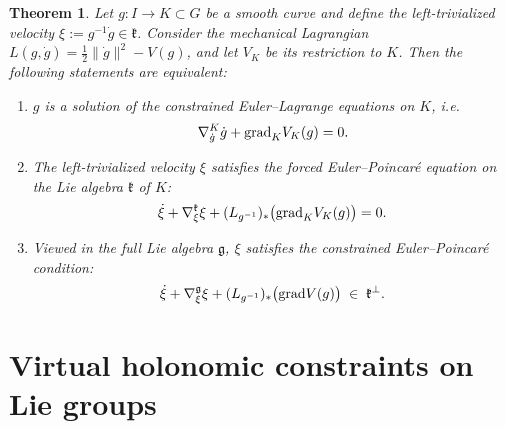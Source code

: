 \documentclass[letterpaper, 10 pt, conference]{ieeeconf}
\newtheorem{theorem}{Theorem}
\newcommand{\grad}{\normalfont{\text{grad}}}
\begin{document}
\begin{theorem}\label{thm:holonomic-EP-left}
Let $g:I\to K\subset G$ be a smooth curve and define the left-trivialized velocity
$\xi := g^{-1}\dot g\in\mathfrak{k}$. Consider the mechanical Lagrangian
$L(g,\dot g)=\tfrac12\|\dot g\|^2 - V(g)$,
and let $V_K$ be its restriction to $K$. Then the following statements are equivalent:
\begin{enumerate}
    \item $g$ is a solution of the constrained Euler--Lagrange equations on $K$, i.e.
    \begin{equation}\label{holonomic:EL}
        \nabla^K_{\dot g}\dot g + \grad_K V_K(g) = 0.
    \end{equation}

    \item The left-trivialized velocity $\xi$ satisfies the forced Euler--Poincar\'e equation
    on the Lie algebra $\mathfrak{k}$ of $K$:
    \begin{equation}\label{holonomic:potential:dynamics}
        \dot\xi + \nabla^{\mathfrak{k}}_{\xi}\xi 
        + (L_{g^{-1}})_\ast\big(\grad_K V_K(g)\big)
        = 0 .
    \end{equation}

    \item Viewed in the full Lie algebra $\mathfrak{g}$, $\xi$ satisfies the constrained
    Euler--Poincar\'e condition:
    \begin{equation}\label{holonomic:constrained:g}
        \dot\xi + \nabla^{\mathfrak{g}}_{\xi}\xi 
        + (L_{g^{-1}})_\ast\big(\grad V(g)\big)
        \;\in\; \mathfrak{k}^\perp .
    \end{equation}
\end{enumerate}
\end{theorem}




\section{Virtual holonomic constraints on Lie groups}\label{sec4}
\end{document}
